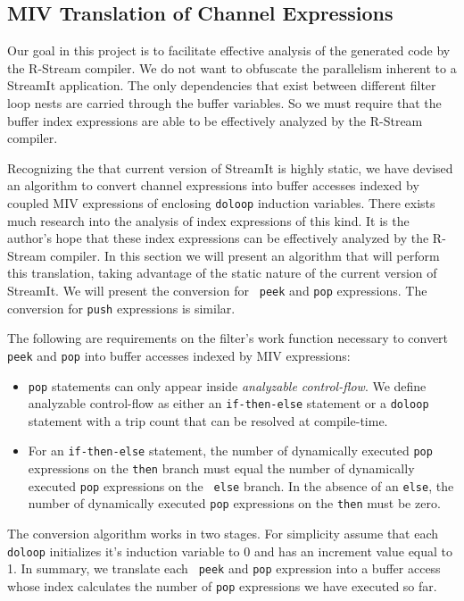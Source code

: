 \documentclass[10pt, letterpaper, onecolumn]{article}
\begin{document}
\subsection{MIV Translation of Channel Expressions}
\label{miv}
Our goal in this project is to facilitate effective analysis of the
generated code by the R-Stream compiler.  We do not want to obfuscate
the parallelism inherent to a StreamIt application.  The only
dependencies that exist between different filter loop nests are
carried through the buffer variables.  So we must require that the
buffer index expressions are able to be effectively analyzed by the
R-Stream compiler.

Recognizing the that current version of StreamIt is highly static, we
have devised an algorithm to convert channel expressions into buffer
accesses indexed by coupled MIV expressions of enclosing {\tt doloop}
induction variables.  There exists much research into the analysis of
index expressions of this kind.  It is the author's hope that these
index expressions can be effectively analyzed by the R-Stream
compiler.  In this section we will present an algorithm that will
perform this translation, taking advantage of the static nature of the
current version of StreamIt.  We will present the conversion for {\tt
  peek} and {\tt pop} expressions.  The conversion for {\tt push}
expressions is similar.

The following are requirements on the filter's work function necessary
to convert {\tt peek} and {\tt pop} into buffer accesses indexed by
MIV expressions:
\begin{itemize}
\item {\tt pop} statements can only appear inside {\it analyzable control-flow}.
  We define analyzable control-flow as either an {\tt if-then-else}
  statement or a {\tt doloop} statement with a trip count that can be
  resolved at compile-time.
\item For an {\tt if-then-else} statement, the number of dynamically
  executed {\tt pop} expressions on the {\tt then} branch must equal
  the number of dynamically executed {\tt pop} expressions on the {\tt
  else} branch.  In the absence of an {\tt else}, the number of
  dynamically executed {\tt pop} expressions on the {\tt then} must be
  zero.
\end{itemize}

The conversion algorithm works in two stages.  For simplicity assume
that each {\tt doloop} initializes it's induction variable to 0 and has
an increment value equal to 1.  In summary, we translate each {\tt
peek} and {\tt pop} expression into a buffer access whose index calculates the
number of {\tt pop} expressions we have executed so far.  
\end{document}
